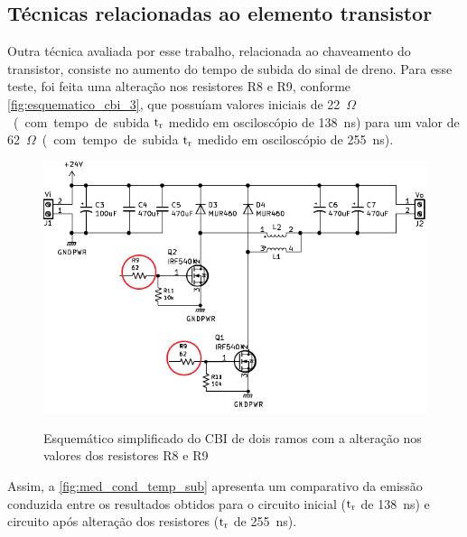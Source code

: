     \subsection{Técnicas relacionadas ao elemento transistor} \label{cap:result_tecnicas_chaveam}
    
    Outra técnica avaliada por esse trabalho, relacionada ao chaveamento do transistor, consiste no aumento do tempo de subida do sinal de dreno. Para esse teste, foi feita uma alteração nos resistores R8 e R9, conforme \autoref{fig:esquematico_cbi_3}, que possuíam valores iniciais de \SI{22}{$\Omega$} (com tempo de subida $\text{t}_\text{r}$ medido em osciloscópio de \SI{138}{\nano\second}) para um valor de \SI{62}{$\Omega$} (com tempo de subida $\text{t}_\text{r}$ medido em osciloscópio de \SI{255}{\nano\second}). 
    
    \begin{figure}[H]
    	\centering
    	\caption{Esquemático simplificado do CBI de dois ramos com a alteração nos valores dos resistores R8 e R9}
    	\includegraphics[scale=1.2]{pdf/layout/Esquematico_CBI_tr.pdf}
        \label{fig:esquematico_cbi_3}
    \end{figure}
    
    Assim, a \autoref{fig:med_cond_temp_sub} apresenta um comparativo da emissão conduzida entre os resultados obtidos para o circuito inicial ($\text{t}_\text{r}$ de \SI{138}{\nano\second}) e circuito após alteração dos resistores ($\text{t}_\text{r}$ de \SI{255}{\nano\second}). 
    
